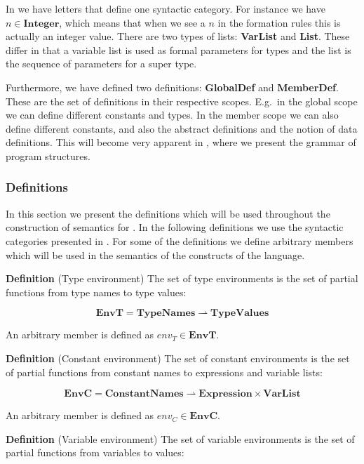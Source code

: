 In  we have letters that define one syntactic
category. For instance we have $n \in \mathbf{Integer}$, which means that when
we see a $n$ in the formation rules this is actually an integer value. There
are two types of lists: \textbf{VarList} and \textbf{List}. These differ in that
a variable list is used as formal parameters for types and the list is the
sequence of parameters for a super type. 

Furthermore, we have defined two definitions: \textbf{GlobalDef} and
\textbf{MemberDef}. These are the set of definitions in their respective scopes.
E.g.\ in the global scope we can define different constants and types. In the
member scope we can also define different constants, and also the abstract
definitions and the notion of data definitions. This will become very apparent
in , where we present the grammar of program structures.

\subsubsection{Definitions}
\label{sec:abstractdefinitions}

In this section we present the definitions which will be used throughout the
construction of semantics for \productname{}. In the following definitions we
use the syntactic categories presented in . For some of
the definitions we define arbitrary members which will be used in the semantics
of the constructs of the language.

\textbf{Definition} (Type environment) \hspace{0.5cm} The set of type environments is the set of
partial functions from type names to type values:

\[
  \mathbf{EnvT} = \mathbf{TypeNames} \rightharpoonup \mathbf{TypeValues}
\]

An arbitrary member is defined as $env_{T} \in \mathbf{EnvT}$.


\textbf{Definition} (Constant environment) \hspace{0.5cm} The set of constant environments is the set
of partial functions from constant names to expressions and variable lists:

\[
  \mathbf{EnvC} = \mathbf{ConstantNames} \rightharpoonup \mathbf{Expression}
  \times \mathbf{VarList}
\]

An arbitrary member is defined as $env_{C} \in \mathbf{EnvC}$.

\textbf{Definition} (Variable environment) \hspace{0.5cm} The set of variable environments is the set
of partial functions from variables to values:

